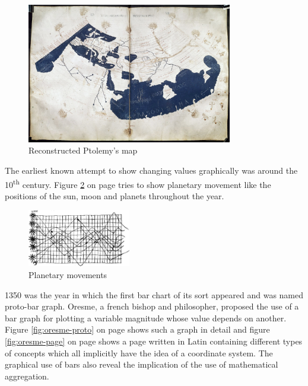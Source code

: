 \begin{figure}[!htb]
\centering
\includegraphics[width=0.8\textwidth,keepaspectratio]{images/history/ptolemy-map.jpg}
\caption[
    Reconstructed Ptolemy's map, Urldate: 07.2016 \newline
\small\texttt{\url{https://upload.wikimedia.org/wikipedia/commons/2/23/PtolemyWorldMap.jpg}}
]{Reconstructed Ptolemy's map}
\label{fig:ptolemy}
\end{figure}

The earliest known attempt to show changing values graphically was around the 10\textsuperscript{th} century. Figure \ref{fig:planetary-movement} on page \pageref{fig:planetary-movement} tries to show planetary movement like the positions of the sun, moon and planets throughout the year.

\begin{figure}[!htb]
\centering
\includegraphics[width=0.4\textwidth,keepaspectratio]{images/history/planetary-movement.jpg}
\caption[
    Planetary movements, Urldate: 07.2016 \newline
\small\texttt{\url{http://www.fi.uu.nl/wiskrant/artikelen/hist_grafieken/begin/images/planeten.gif}}
]{Planetary movements}
\label{fig:planetary-movement}
\end{figure}

1350 was the year in which the first bar chart of its sort appeared and was named proto-bar graph. Oresme, a french bishop and philosopher, proposed the use of a bar graph for plotting a variable magnitude whose value depends on another. Figure \ref{fig:oresme-proto} on page \pageref{fig:oresme-proto} shows such a graph in detail and figure \ref{fig:oresme-page} on page \pageref{fig:oresme-page} shows a page written in Latin containing different types of concepts which all implicitly have the idea of a coordinate system. The graphical use of bars also reveal the implication of the use of mathematical aggregation.

